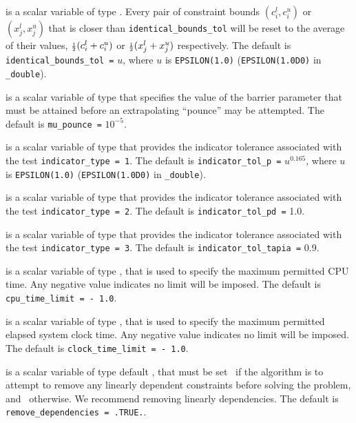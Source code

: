 \begin{description}
is a scalar variable of type \realdp.
Every pair of constraint bounds
$(c_{i}^{l}, c_{i}^{u})$ or $(x_{j}^{l}, x_{j}^{u})$
that is closer than {\tt identical\_bounds\_tol}
will be reset to the average of their values,
${\scriptstyle \frac{1}{2}} (c_{i}^{l} + c_{i}^{u})$ or ${\scriptstyle \frac{1}{2}} (x_{j}^{l} + x_{j}^{u})$
respectively.
The default is {\tt identical\_bounds\_tol =} $u$,
where $u$ is {\tt EPSILON(1.0)} ({\tt EPSILON(1.0D0)} in
{\tt \fullpackagename\_double}).

is a scalar variable of type \realdp that specifies
the value of the barrier parameter that must be attained before an 
extrapolating ``pounce'' may be attempted.
The default is {\tt mu\_pounce =} $10^{-5}$.

is a scalar variable of type \realdp that
provides the indicator tolerance associated with the test
{\tt indicator\_type = 1}.
The default is {\tt indicator\_tol\_p =} $u^{0.165}$,
where $u$ is {\tt EPSILON(1.0)} ({\tt EPSILON(1.0D0)} in
{\tt \fullpackagename\_double}).

is a scalar variable of type \realdp that
provides the indicator tolerance associated with the test
{\tt indicator\_type = 2}.
The default is {\tt indicator\_tol\_pd =} 1.0.

is a scalar variable of type \realdp that
provides the indicator tolerance associated with the test
{\tt indicator\_type = 3}.
The default is {\tt indicator\_tol\-\_tapia =} 0.9.

 is a scalar variable of type \realdp,
that is used to specify the maximum permitted CPU time. Any negative
value indicates no limit will be imposed. The default is
{\tt cpu\_time\_limit = - 1.0}.

 is a scalar variable of type \realdp,
that is used to specify the maximum permitted elapsed system clock time.
Any negative value indicates no limit will be imposed. The default is
{\tt clock\_time\_limit = - 1.0}.

 is a scalar variable of type
default \logical, that must be set \true\ if the algorithm
is to attempt to remove any linearly dependent constraints before
solving the problem, and \false\ otherwise.
We recommend removing linearly dependencies.
The default is {\tt remove\_dependencies = .TRUE.}.


\end{description}
